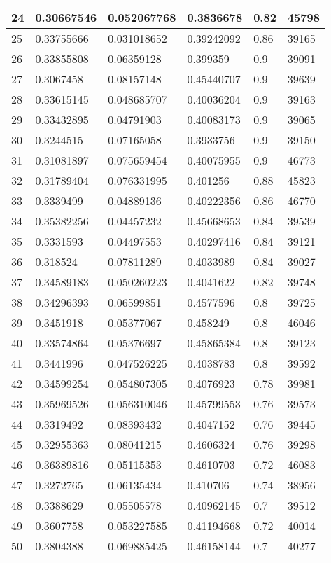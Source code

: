 \begin{longtable}{|l|l|l|l|l|l|}
24 & 0.30667546 & 0.052067768 & 0.3836678 & 0.82 & 45798 \\ \hline 
25 & 0.33755666 & 0.031018652 & 0.39242092 & 0.86 & 39165 \\ \hline 
26 & 0.33855808 & 0.06359128 & 0.399359 & 0.9 & 39091 \\ \hline 
27 & 0.3067458 & 0.08157148 & 0.45440707 & 0.9 & 39639 \\ \hline 
28 & 0.33615145 & 0.048685707 & 0.40036204 & 0.9 & 39163 \\ \hline 
29 & 0.33432895 & 0.04791903 & 0.40083173 & 0.9 & 39065 \\ \hline 
30 & 0.3244515 & 0.07165058 & 0.3933756 & 0.9 & 39150 \\ \hline 
31 & 0.31081897 & 0.075659454 & 0.40075955 & 0.9 & 46773 \\ \hline 
32 & 0.31789404 & 0.076331995 & 0.401256 & 0.88 & 45823 \\ \hline 
33 & 0.3339499 & 0.04889136 & 0.40222356 & 0.86 & 46770 \\ \hline 
34 & 0.35382256 & 0.04457232 & 0.45668653 & 0.84 & 39539 \\ \hline 
35 & 0.3331593 & 0.04497553 & 0.40297416 & 0.84 & 39121 \\ \hline 
36 & 0.318524 & 0.07811289 & 0.4033989 & 0.84 & 39027 \\ \hline 
37 & 0.34589183 & 0.050260223 & 0.4041622 & 0.82 & 39748 \\ \hline 
38 & 0.34296393 & 0.06599851 & 0.4577596 & 0.8 & 39725 \\ \hline 
39 & 0.3451918 & 0.05377067 & 0.458249 & 0.8 & 46046 \\ \hline 
40 & 0.33574864 & 0.05376697 & 0.45865384 & 0.8 & 39123 \\ \hline 
41 & 0.3441996 & 0.047526225 & 0.4038783 & 0.8 & 39592 \\ \hline 
42 & 0.34599254 & 0.054807305 & 0.4076923 & 0.78 & 39981 \\ \hline 
43 & 0.35969526 & 0.056310046 & 0.45799553 & 0.76 & 39573 \\ \hline 
44 & 0.3319492 & 0.08393432 & 0.4047152 & 0.76 & 39445 \\ \hline 
45 & 0.32955363 & 0.08041215 & 0.4606324 & 0.76 & 39298 \\ \hline 
46 & 0.36389816 & 0.05115353 & 0.4610703 & 0.72 & 46083 \\ \hline 
47 & 0.3272765 & 0.06135434 & 0.410706 & 0.74 & 38956 \\ \hline 
48 & 0.3388629 & 0.05505578 & 0.40962145 & 0.7 & 39512 \\ \hline 
49 & 0.3607758 & 0.053227585 & 0.41194668 & 0.72 & 40014 \\ \hline 
50 & 0.3804388 & 0.069885425 & 0.46158144 & 0.7 & 40277 \\ \hline 
\end{longtable}